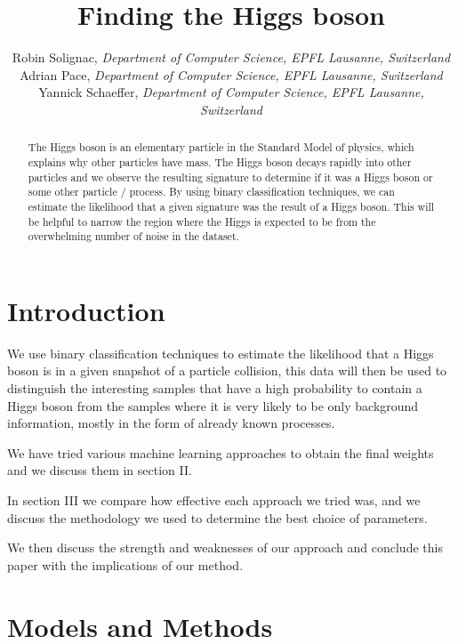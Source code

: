 \documentclass[10pt,conference,compsocconf]{IEEEtran}
\begin{document}
\title{Finding the Higgs boson}

\author{
  Robin Solignac,
  \textit{Department of Computer Science, EPFL Lausanne, Switzerland}\\
  Adrian Pace,
  \textit{Department of Computer Science, EPFL Lausanne, Switzerland}\\
  Yannick Schaeffer,
  \textit{Department of Computer Science, EPFL Lausanne, Switzerland}
}

\maketitle

\begin{abstract}
 The Higgs boson is an elementary particle in the Standard Model of physics, which explains why other particles have mass. The Higgs boson decays rapidly into other particles and we observe the resulting signature to determine if it was a Higgs boson or some other particle / process. By using binary classification techniques, we can estimate the likelihood that a given signature was the result of a Higgs boson. This will be helpful to narrow the region where the Higgs is expected to be from the overwhelming number of noise in the dataset.
\end{abstract}

\section{Introduction}
We use binary classification techniques to estimate the likelihood that a Higgs boson is in a given snapshot of a particle collision, this data will then be used to distinguish the interesting samples that have a high probability to contain a Higgs boson from the samples where it is very likely to be only background information, mostly in the form of already known processes.

We have tried various machine learning approaches to obtain the final weights and we discuss them in section II.

In section III we compare how effective each approach we tried was, and we discuss the methodology we used to determine the best choice of parameters.

We then discuss the strength and weaknesses of our approach and conclude this paper with the implications of our method.

\section{Models and Methods}
\end{document}
